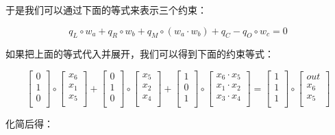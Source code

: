 于是我们可以通过下面的等式来表示三个约束：

\[
q_L \circ w_a + q_R \circ w_b + q_M\circ(w_a\cdot w_b) + q_C -  q_O\circ w_c = 0
\]

如果把上面的等式代入并展开，我们可以得到下面的约束等式：

\[
\left[
\begin{array}{c}
0\\
1 \\
0\\
\end{array}
\right]
\circ
\left[
\begin{array}{c}
x_6 \\
x_1 \\
x_5\\
\end{array}
\right]
+
\left[
\begin{array}{c}
0\\
1 \\
0\\
\end{array}
\right]
\circ
\left[
\begin{array}{c}
x_5 \\
x_2 \\
x_4\\
\end{array}
\right]
+
\left[
\begin{array}{c}
1\\
0 \\
1\\
\end{array}
\right]
\circ
\left[
\begin{array}{c}
x_6\cdot x_5 \\
x_1\cdot x_2 \\
x_3\cdot x_4\\
\end{array}
\right]=\left[
\begin{array}{c}
1\\
1 \\
1\\
\end{array}
\right]
\circ
\left[
\begin{array}{c}
out \\
x_6 \\
x_5\\
\end{array}
\right]
\]

化简后得：

